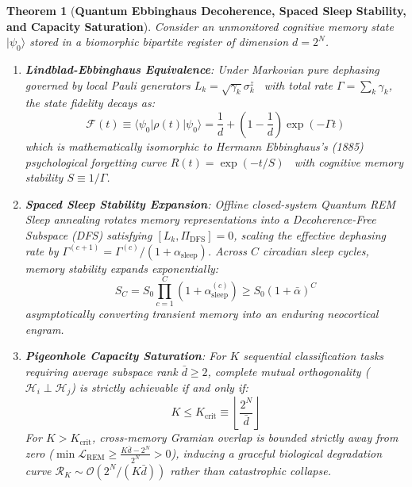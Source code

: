 \documentclass[10pt,twocolumn,3p]{article}
\newtheorem{theorem}{Theorem}
\begin{document}
\begin{theorem}[\textbf{Quantum Ebbinghaus Decoherence, Spaced Sleep Stability, and Capacity Saturation}]
\label{thm:ebbinghaus_capacity}
Consider an unmonitored cognitive memory state $|\psi_0\rangle$ stored in a biomorphic bipartite register of dimension $d = 2^N$.
\begin{enumerate}
    \item \textbf{Lindblad-Ebbinghaus Equivalence}: Under Markovian pure dephasing governed by local Pauli generators $L_k = \sqrt{\gamma_k} \sigma_k^z$~\cite{lindblad1976,gks1976} with total rate $\Gamma = \sum_k \gamma_k$, the state fidelity decays as:
    \begin{equation}
        \mathcal{F}(t) \equiv \langle \psi_0 | \rho(t) | \psi_0 \rangle = \frac{1}{d} + \left(1 - \frac{1}{d}\right) \exp(-\Gamma t)
    \end{equation}
    which is mathematically isomorphic to Hermann Ebbinghaus's (1885) psychological forgetting curve $R(t) = \exp(-t/S)$~\cite{ebbinghaus1885} with cognitive memory stability $S \equiv 1/\Gamma$.
    \item \textbf{Spaced Sleep Stability Expansion}: Offline closed-system Quantum REM Sleep annealing rotates memory representations into a Decoherence-Free Subspace (DFS) satisfying $[L_k, \Pi_{\text{DFS}}] = 0$, scaling the effective dephasing rate by $\Gamma^{(c+1)} = \Gamma^{(c)} / (1 + \alpha_{\text{sleep}})$. Across $C$ circadian sleep cycles, memory stability expands exponentially:
    \begin{equation}
        S_C = S_0 \prod_{c=1}^C (1 + \alpha_{\text{sleep}}^{(c)}) \ge S_0 (1 + \bar{\alpha})^C
    \end{equation}
    asymptotically converting transient memory into an enduring neocortical engram.
    \item \textbf{Pigeonhole Capacity Saturation}: For $K$ sequential classification tasks requiring average subspace rank $\bar{d} \ge 2$, complete mutual orthogonality ($\mathcal{H}_i \perp \mathcal{H}_j$) is strictly achievable if and only if:
    \begin{equation}
        K \le K_{\text{crit}} \equiv \left\lfloor \frac{2^N}{\bar{d}} \right\rfloor
    \end{equation}
    For $K > K_{\text{crit}}$, cross-memory Gramian overlap is bounded strictly away from zero ($\min \mathcal{L}_{\text{REM}} \ge \frac{K \bar{d} - 2^N}{2^N} > 0$), inducing a graceful biological degradation curve $\mathcal{R}_K \sim \mathcal{O}(2^N / (K \bar{d}))$ rather than catastrophic collapse.
\end{enumerate}
\end{theorem}
\end{document}
